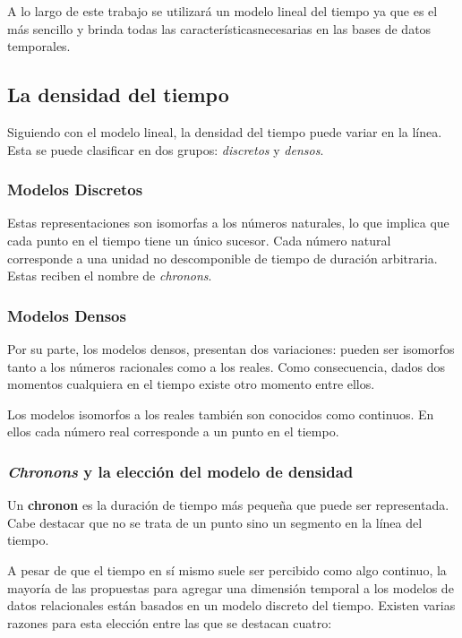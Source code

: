 A lo largo de este trabajo se utilizará un modelo lineal del tiempo ya que es el más sencillo
y brinda todas las característicasnecesarias en las bases de datos temporales.

\subsection{La densidad del tiempo}

Siguiendo con el modelo lineal, la densidad del tiempo puede variar en la línea.
Esta se puede clasificar en dos grupos: \textit{discretos} y \textit{densos}.

\subsubsection{Modelos Discretos}

Estas representaciones son isomorfas a los números naturales, lo que implica que cada punto en el tiempo tiene un único sucesor. Cada número natural corresponde a una unidad no descomponible de tiempo de duración arbitraria. Estas reciben el nombre de \textit{chronons}.  

\subsubsection{Modelos Densos}

Por su parte, los modelos densos, presentan dos variaciones: pueden ser isomorfos tanto a los números racionales como a los reales. Como consecuencia, dados dos momentos cualquiera en el tiempo existe otro momento entre ellos.

Los modelos isomorfos a los reales también son conocidos como continuos. En ellos cada número real corresponde a un punto en el tiempo. 




\subsubsection{\textit{Chronons} y la elección del modelo de densidad}
Un \textbf{chronon} es la duración de tiempo más pequeña que puede ser representada. Cabe destacar que no se trata de un punto sino un segmento en la línea del tiempo.

A pesar de que el tiempo en sí mismo suele ser percibido como algo continuo, la mayoría de las propuestas para agregar una dimensión temporal a los modelos de datos relacionales están basados en un modelo discreto del tiempo. Existen varias razones para esta elección entre las que se destacan cuatro:


